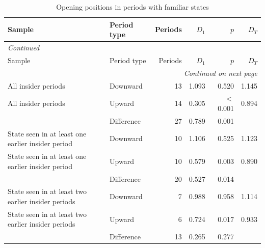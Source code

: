 \footnotesize
\begin{longtable}{p{5.2cm}lrrrr}
\caption{Opening positions in periods with familiar states}\label{tab:app-human-familiar}\\
\toprule
Sample & Period type & Periods & $D_1$ & $p$ & $D_T$ \\
\midrule
\endfirsthead
\multicolumn{6}{l}{\textit{Continued}}\\
\toprule
Sample & Period type & Periods & $D_1$ & $p$ & $D_T$ \\
\midrule
\endhead
\midrule
\multicolumn{6}{r}{\textit{Continued on next page}}\\
\endfoot
\bottomrule
\endlastfoot
All insider periods & Downward & 13 & 1.093 & 0.520 & 1.145 \\
All insider periods & Upward & 14 & 0.305 & $<$0.001 & 0.894 \\
 & Difference & 27 & 0.789 & 0.001 & \\
\addlinespace
State seen in at least one earlier insider period & Downward & 10 & 1.106 & 0.525 & 1.123 \\
State seen in at least one earlier insider period & Upward & 10 & 0.579 & 0.003 & 0.890 \\
 & Difference & 20 & 0.527 & 0.014 & \\
\addlinespace
State seen in at least two earlier insider periods & Downward & 7 & 0.988 & 0.958 & 1.114 \\
State seen in at least two earlier insider periods & Upward & 6 & 0.724 & 0.017 & 0.933 \\
 & Difference & 13 & 0.265 & 0.277 & \\
\end{longtable}
